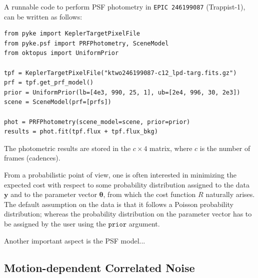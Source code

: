 \documentclass{article}
\begin{document}
A runnable code to perform PSF photometry in \texttt{EPIC 246199087}
(Trappist-1), can be written as follows:

\begin{verbatim}
from pyke import KeplerTargetPixelFile
from pyke.psf import PRFPhotometry, SceneModel
from oktopus import UniformPrior

tpf = KeplerTargetPixelFile("ktwo246199087-c12_lpd-targ.fits.gz")
prf = tpf.get_prf_model()
prior = UniformPrior(lb=[4e3, 990, 25, 1], ub=[2e4, 996, 30, 2e3])
scene = SceneModel(prf=[prfs])

phot = PRFPhotometry(scene_model=scene, prior=prior)
results = phot.fit(tpf.flux + tpf.flux_bkg)
\end{verbatim}

The photometric results are stored in the $c \times 4$ matrix, where $c$ is the
number of frames (cadences).

From a probabilistic point of view, one is often interested in minimizing the
expected cost with respect to some probability distribution assigned to the data
$\bm{y}$ and to the parameter vector $\bm{\theta}$, from which the cost function
$R$ naturally arises. The default assumption on the data is that it follows
a Poisson probability distribution; whereas the probability distribution on the
parameter vector has to be assigned by the user using the $\texttt{prior}$
argument.

Another important aspect is the PSF model...

\subsection{Motion-dependent Correlated Noise}
\label{subsection:motion}
\end{document}
